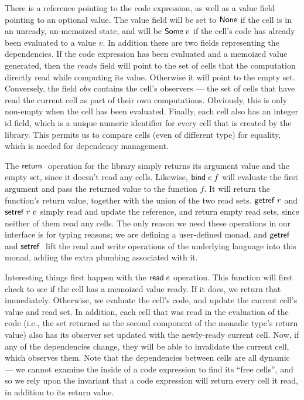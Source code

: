 There is a reference pointing to the code expression, as well as a
value field pointing to an optional value. The value field will be set
to $\mathsf{None}$ if the cell is in an unready, un-memoized state, and
will be $\mathsf{Some}\;v$ if the cell's code has already been
evaluated to a value $v$. In addition there are two fields
representing the dependencies. If the code expression has been
evaluated and a memoized value generated, then the $reads$ field will
point to the set of cells that the computation directly read while
computing its value. Otherwise it will point to the empty
set. Conversely, the field $obs$ contains the cell's observers --- the
set of cells that have read the current cell as part of their own
computations. Obviously, this is only non-empty when the cell has been
evaluated. Finally, each cell also has an integer id field, which is a
unique numeric identifier for every cell that is created by the
library. This permits us to compare cells (even of different type) for
equality, which is needed for dependency management.

The $\mathsf{return}\;$ operation for the library simply returns its argument
value and the empty set, since it doesn't read any cells. Likewise,
$\mathsf{bind}\; e\;f$ will evaluate the first argument and pass the returned
value to the function $f$. It will return the function's return value,
together with the union of the two read sets. $\mathsf{getref}\; r$ and $\mathsf{setref}\;
r\;v$ simply read and update the reference, and return empty read
sets, since neither of them read any cells. The only reason we need 
these operations in our interface is for typing reasons; we are defining
a user-defined monad, and $\mathsf{getref}\;$ and $\mathsf{setref}\;$ lift the read and
write operations of the underlying language into this monad, adding 
the extra plumbing associated with it.

Interesting things first happen with the $\mathsf{read}\; e$ operation. This
function will first check to see if the cell has a memoized value
ready. If it does, we return that immediately. Otherwise, we evaluate
the cell's code, and update the current cell's value and read set. In
addition, each cell that was read in the evaluation of the code (i.e.,
the set returned as the second component of the monadic type's return
value) also has its observer set updated with the newly-ready current
cell. Now, if any of the dependencies change, they will be able to
invalidate the current cell, which observes them. Note that the
dependencies between cells are all dynamic --- we cannot examine the
inside of a code expression to find its ``free cells'', and so we rely
upon the invariant that a code expression will return every cell it
read, in addition to its return value.

